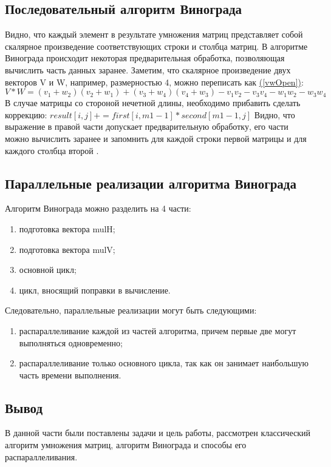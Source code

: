 \documentclass{article}
\begin{document}
		\subsection{Последовательный алгоритм Винограда}
		Видно, что каждый элемент в результате умножения матриц представляет собой скалярное произведение соответствующих строки и столбца матриц. В алгоритме Винограда происходит некоторая предварительная обработка, позволяющая вычислить часть данных заранее. Заметим, что скалярное произведение двух векторов V и W, например, размерностью 4, можно переписать как \hyperref[vwOpen]{(\ref{vwOpen})}:
		\begin{equation}\label{vwOpen}
		V * W = (v_{1} + w_{2})(v_{2} + w_{1}) + (v_{3} + w_{4})(v_{4} + w_{3}) -  v_{1}v_{2} - v_{3}v_{4} - w_{1}w_{2} - w_{3}w_{4}
	\end{equation}
	\indent В случае матрицы со стороной нечетной длины, необходимо прибавить сделать коррекцию: $result[i, j] += first[i, m1 - 1] * second[m1 - 1, j]$
	\newline \indent Видно, что выражение в правой части допускает предварительную обработку, его части можно вычислить заранее и запомнить для каждой строки первой матрицы и для каждого столбца второй \cite{vinogradRef}.

	\subsection{Параллельные реализации алгоритма Винограда}
Алгоритм Винограда можно разделить на 4 части:
\begin{enumerate}
\item подготовка вектора mulH;
\item подготовка вектора mulV;
\item основной цикл;
\item цикл, вносящий поправки в вычисление.
\end{enumerate}
Следовательно, параллельные реализации могут быть следующими:
\begin{enumerate}
\item распараллеливание каждой из частей алгоритма, причем первые две могут выполняться одновременно;
\item распараллеливание только основного цикла, так как он занимает наибольшую часть времени выполнения.
\end{enumerate}
	\subsection{Вывод}
	В данной части были поставлены задачи и цель работы, рассмотрен классический  алгоритм умножения матриц, алгоритм Винограда и способы его распараллеливания.
		
\end{document}
